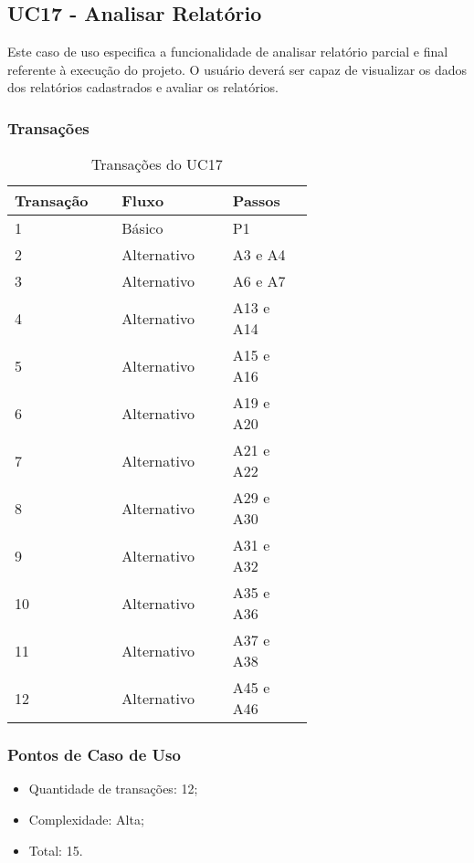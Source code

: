   \vfill

\pagebreak
\subsection{UC17 - Analisar Relatório}
  
  Este caso de uso especifica a funcionalidade de analisar relatório parcial e final referente à execução do projeto.
  O usuário deverá ser capaz de visualizar os dados dos relatórios cadastrados e avaliar os relatórios.
  
  \subsubsection{Transações}

  \begin{table*}[!h]
  \centering
  \caption{Transações do UC17}
  \label{Rotulo}
    \begin{tabular}{|p{0.20\linewidth}|p{0.25\linewidth}|p{0.20\linewidth}|}
    \hline
    \textbf{Transação} & \textbf{Fluxo} & \textbf{Passos} \\ 
    \hline
    1 & Básico & P1\\
    \hline
    2 & Alternativo & A3 e A4\\
    \hline
    3 & Alternativo & A6 e A7\\
    \hline
    4 & Alternativo & A13 e A14\\
    \hline
    5 & Alternativo & A15 e A16\\
    \hline
    6 & Alternativo & A19 e A20\\
    \hline
    7 & Alternativo & A21 e A22\\
    \hline
    8 & Alternativo & A29 e A30\\
      \hline
    9 & Alternativo & A31 e A32\\
      \hline
    10 & Alternativo & A35 e A36\\
      \hline
    11 & Alternativo & A37 e A38\\
      \hline
    12 & Alternativo & A45 e A46\\
    \hline
    \end{tabular}
  \end{table*}

  \subsubsection{Pontos de Caso de Uso}

  \begin{itemize}
  \item Quantidade de transações: 12;
  \item Complexidade: Alta;
  \item Total: 15.
  \end{itemize}
  
